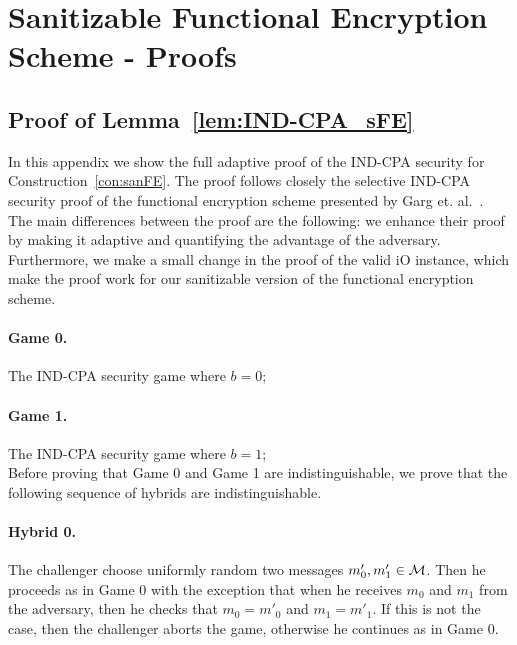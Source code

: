 \documentclass{llncs}
\begin{document}
\section{Sanitizable Functional Encryption Scheme - Proofs}

\subsection{Proof of Lemma~\ref{lem:IND-CPA_sFE}}\label{app:IND-CPA_sFE}
\setcounter{claimcounter}{0}

In this appendix we show the full adaptive proof of the IND-CPA security for Construction~\ref{con:sanFE}. The proof follows closely the selective IND-CPA security proof of the functional encryption scheme presented by Garg et. al.~\cite{DBLP:conf/focs/GargGH0SW13}. 
The main differences between the proof are the following: we enhance their proof by making it adaptive and quantifying the advantage of the adversary. Furthermore, we make a small change in the proof of the valid iO instance, which make the proof work for our sanitizable version of the functional encryption scheme.

\paragraph{Game 0.} The IND-CPA security game where $b=0$;

\paragraph{Game 1.} The IND-CPA security game where $b=1$; \\

Before proving that Game 0 and Game 1 are indistinguishable, we prove that the following sequence of hybrids are indistinguishable. 

\paragraph{Hybrid 0.} The challenger choose uniformly random two messages $m'_0,m'_1 \in \mathcal{M}$. Then he proceeds as in Game 0 with the exception that when he receives $m_0$ and $m_1$ from the adversary, then he checks that $m_0 = m'_0$ and $m_1 = m'_1$. If this is not the case, then the challenger aborts the game, otherwise he continues as in Game 0.
\end{document}
